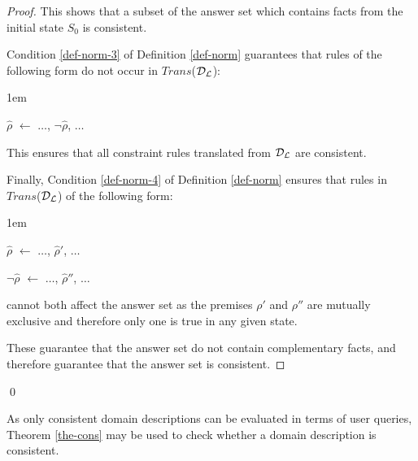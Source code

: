 \documentclass[glov2,twocolumn,final]{svjour2}
\newenvironment{vproof}
  {\begin{proof}\hspace{0.1em}}
  {\end{proof}\qed}
\newenvironment{vquote}
  {\begin{list}{}{\leftmargin 1em}\item[]}
  {\end{list}}
\begin{document}
\begin{vproof}
      \noindent
      This shows that a subset of the answer set which contains facts from the
      initial state $S_{0}$ is consistent.

      Condition \ref{def-norm-3} of Definition \ref{def-norm} guarantees that
      rules of the following form do not occur in $Trans$(${\cal D}_{\cal L}$):

      \begin{vquote}
        $\hat{\rho}$ $\leftarrow$ $\hdots$, $\lnot\hat{\rho}$, $\hdots$
      \end{vquote}

      \noindent
      This ensures that all constraint rules translated from
      ${\cal D}_{\cal L}$ are consistent.

      Finally, Condition \ref{def-norm-4} of Definition \ref{def-norm}
      ensures that rules in $Trans$(${\cal D}_{\cal L}$) of the following form:

      \begin{vquote}
        $\hat{\rho}$ $\leftarrow$ $\hdots$, $\hat{\rho}'$, $\hdots$

        $\lnot \hat{\rho}$ $\leftarrow$ $\hdots$, $\hat{\rho}''$, $\hdots$
      \end{vquote}

      \noindent
      cannot both affect the answer set as the premises $\rho'$ and $\rho''$
      are mutually exclusive and therefore only one is true in any given state.

      These guarantee that the answer set do not contain complementary facts,
      and therefore guarantee that the answer set is consistent.
    \end{vproof}

    As only consistent domain descriptions can be evaluated in terms of user
    queries, Theorem \ref{the-cons} may be used to check whether a domain
    description is consistent.
\end{document}
